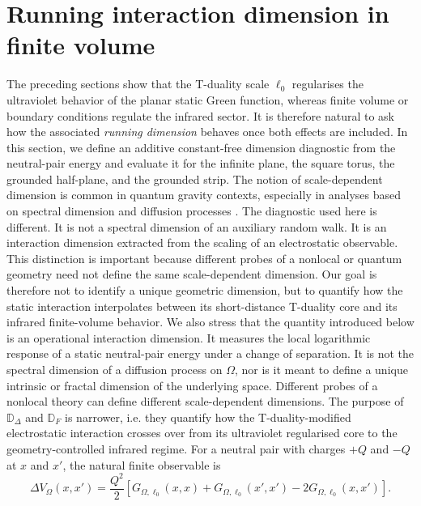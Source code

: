 \documentclass[openacc]{rsproca_new}%
\begin{document}
\section{Running interaction dimension in finite volume}
\label{sec:running_dimension}

The preceding sections show that the T-duality scale $\ell_0$ regularises the ultraviolet behavior of the planar static Green function, whereas finite volume or boundary conditions regulate the infrared sector. It is therefore natural to ask how the associated {\it{running dimension}} behaves once both effects are included. In this section, we define an additive constant-free dimension diagnostic from the neutral-pair energy and evaluate it for the infinite plane, the square torus, the grounded half-plane, and the grounded strip. The notion of scale-dependent dimension is common in quantum gravity contexts, especially in analyses based on spectral dimension and diffusion processes  \cite{AmbjornJurkiewiczLoll2005, Benedetti2009, Horava2009, ModestoNicolini2010, Carlip2019, Calcagni2017}. The diagnostic used here is different. It is not a spectral dimension of an auxiliary random walk. It is an interaction dimension extracted from the scaling of an electrostatic observable. This distinction is important because different probes of a nonlocal or quantum geometry need not define the same scale-dependent dimension. Our goal is therefore not to identify a unique geometric dimension, but to quantify how the static interaction interpolates between its short-distance T-duality core and its infrared finite-volume behavior.  We also stress that the quantity introduced below is an operational interaction dimension. It measures the local logarithmic response of a static neutral-pair energy under a change of separation. It is not the spectral dimension of a diffusion process on $\Omega$, nor is it meant to define a unique intrinsic or fractal dimension of the underlying space. Different probes of a nonlocal theory can define different scale-dependent dimensions. The purpose of $\mathbb D_\Delta$ and $\mathbb D_F$ is narrower, i.e. they quantify how the T-duality-modified electrostatic interaction crosses over from its ultraviolet regularised core to the geometry-controlled infrared regime. For a neutral pair with charges $+Q$ and $-Q$ at $x$ and $x'$, the natural finite observable is
\begin{equation}
  \Delta V_\Omega(x,x')=\frac{Q^2}{2}\left[G_{\Omega,\ell_0}(x,x)+G_{\Omega,\ell_0}(x',x') - 2G_{\Omega,\ell_0}(x,x')\right].
\end{equation}
\end{document}
